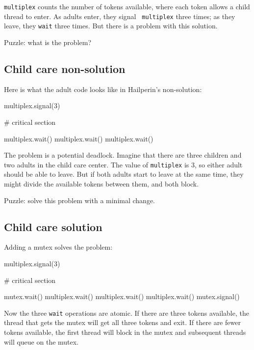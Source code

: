 \documentclass{book}
\begin{document}
{\tt multiplex} counts the number of tokens available, where each token
allows a child thread to enter.  As adults enter, they signal {\tt
        multiplex} three times; as they leave, they {\tt wait} three times.
But there is a problem with this solution.

Puzzle: what is the problem?



\subsection {Child care non-solution}

Here is what the adult code looks like in Hailperin's non-solution:


\begin{unbreakable}[title={Child care non-solution (adult)}]{}
multiplex.signal(3)

# critical section

multiplex.wait()
multiplex.wait()
multiplex.wait()
\end{unbreakable}

The problem is a potential deadlock.  Imagine that there are
three children and two adults in the child care center.  The
value of {\tt multiplex} is 3, so either adult should be able
to leave.  But if both adults start to leave at the same time,
they might divide the available tokens between them, and both
block.

Puzzle: solve this problem with a minimal change.



\subsection {Child care solution}

Adding a mutex solves the problem:


\begin{unbreakable}[title={Child care solution (adult)}]{}
multiplex.signal(3)

# critical section

mutex.wait()
    multiplex.wait()
    multiplex.wait()
    multiplex.wait()
mutex.signal()
\end{unbreakable}

Now the three {\tt wait} operations are atomic.  If there
are three tokens available, the thread that gets the mutex
will get all three tokens and exit.  If there are fewer
tokens available, the first thread will block in the mutex
and subsequent threads will queue on the mutex.
\end{document}
